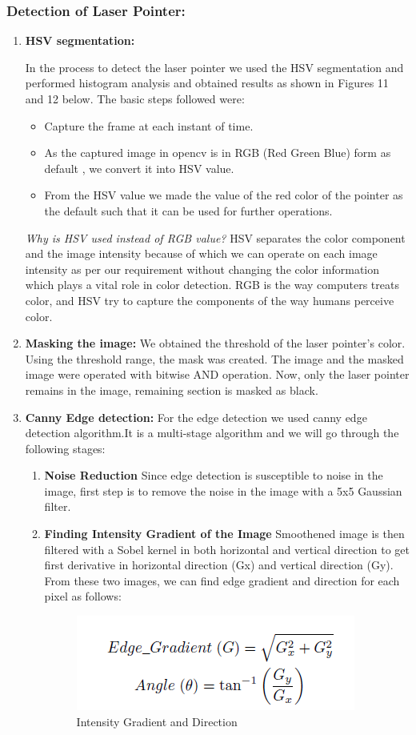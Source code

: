 \documentclass[12pt, a4paper]{article}
\begin{document}
\subsubsection{Detection of Laser Pointer:}
\begin{enumerate}
	\item \textbf{HSV segmentation:}

	In the process to detect the laser pointer we used the HSV segmentation and performed histogram analysis and obtained results as shown in Figures 11 and 12 below.
	The basic steps followed were:
	\begin{itemize}
	\item Capture the frame at each instant of time.
	\item As the captured image in opencv is in RGB (Red Green Blue) form as default , we convert it into HSV value.
	\item From the HSV value we made the value of the red color of the pointer as the default such that it can be used for further operations.
	\end{itemize}
	\emph {Why is HSV used instead of RGB value?}
	HSV separates the color component and the image intensity because of which we can operate on each image intensity as per our requirement without changing the color information which plays a vital role in color detection. RGB is the way computers treats color, and HSV try to capture the components of the way humans perceive color.   
	\item \textbf{Masking the image:}
		We obtained the threshold of the laser pointer’s color. Using the threshold range, the mask was created. The image and the masked image were operated with bitwise AND operation. Now, only the laser pointer remains in the image, remaining section is masked as black.

	\item \textbf{Canny Edge detection:}
For the edge detection we used canny edge detection algorithm.It is a multi-stage algorithm and we will go through the following stages:
\begin{enumerate}
\item \textbf {Noise Reduction}
Since edge detection is susceptible to noise in the image, first step is to remove the noise in the image with a 5x5 Gaussian filter.
\item \textbf{Finding Intensity Gradient of the Image}
Smoothened image is then filtered with a Sobel kernel in both horizontal and vertical direction to get first derivative in horizontal direction (Gx) and vertical direction (Gy). From these two images, we can find edge gradient and direction for each pixel as follows:
\begin{figure}[htp]
\centering
\includegraphics[scale=0.7]{canny.png}
\caption{Intensity Gradient and Direction}
\label{}
\end{figure}


\end{enumerate}
\end{enumerate}
\end{document}
